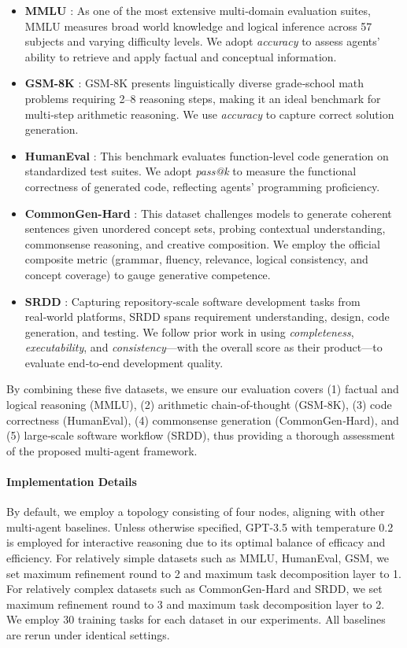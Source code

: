 \documentclass[preprint]{article}
\begin{document}
\begin{itemize}[left=0pt, noitemsep]
    \item \textbf{MMLU} \citet{Hendrycks2020MeasuringMM}: As one of the most extensive multi‑domain evaluation suites, MMLU measures broad world knowledge and logical inference across 57 subjects and varying difficulty levels. We adopt \textit{accuracy} to assess agents’ ability to retrieve and apply factual and conceptual information.  
    \item \textbf{GSM-8K} \citet{Cobbe2021Training}: GSM‑8K presents linguistically diverse grade‑school math problems requiring 2–8 reasoning steps, making it an ideal benchmark for multi‑step arithmetic reasoning. We use \textit{accuracy} to capture correct solution generation.  
    \item \textbf{HumanEval} \citet{chen2021evaluating}: This benchmark evaluates function‑level code generation on standardized test suites. We adopt \textit{pass@k} to measure the functional correctness of generated code, reflecting agents’ programming proficiency.    
    \item \textbf{CommonGen-Hard} \citet{Madaan2023Self}: This dataset challenges models to generate coherent sentences given unordered concept sets, probing contextual understanding, commonsense reasoning, and creative composition. We employ the official composite metric (grammar, fluency, relevance, logical consistency, and concept coverage) to gauge generative competence.
    \item \textbf{SRDD} \citet{qian2023communicative}: Capturing repository‑scale software development tasks from real‑world platforms, SRDD spans requirement understanding, design, code generation, and testing. We follow prior work in using \textit{completeness}, \textit{executability}, and \textit{consistency}—with the overall score as their product—to evaluate end‑to‑end development quality.
\end{itemize}

By combining these five datasets, we ensure our evaluation covers (1) factual and logical reasoning (MMLU), (2) arithmetic chain‑of‑thought (GSM‑8K), (3) code correctness (HumanEval), (4) commonsense generation (CommonGen‑Hard), and (5) large‑scale software workflow (SRDD), thus providing a thorough assessment of the proposed multi-agent framework.  


\paragraph{Implementation Details}
By default, we employ a topology consisting of four nodes, aligning with other multi-agent baselines.
Unless otherwise specified, GPT-3.5 with temperature 0.2 is employed for interactive reasoning due to its optimal balance of efficacy and efficiency. 
For relatively simple datasets such as MMLU, HumanEval, GSM, we set maximum refinement round to 2 and maximum task decomposition layer to 1.
For relatively complex datasets such as CommonGen-Hard and SRDD, we 
set maximum refinement round to 3 and maximum task decomposition layer to 2.
We employ 30 training tasks for each dataset in our experiments. 
All baselines are rerun under identical settings.
\end{document}
